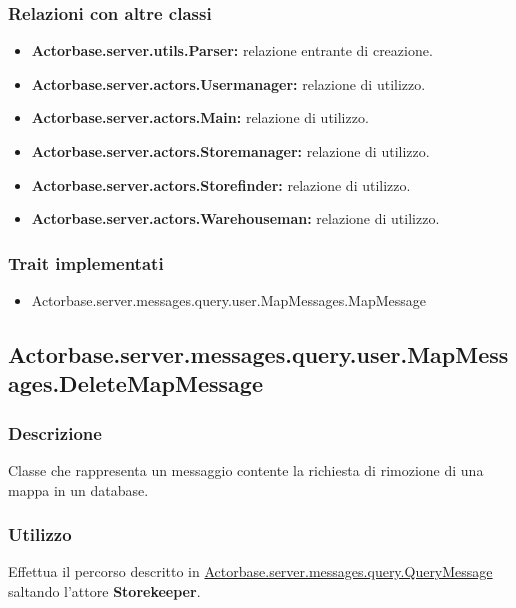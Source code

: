 \documentclass[a4paper]{article}
\begin{document}
			\subsubsection{Relazioni con altre classi}
				\begin{itemize}
					\item \textbf{Actorbase.server.utils.Parser:} relazione entrante di creazione.
					\item \textbf{Actorbase.server.actors.Usermanager:} relazione di utilizzo.
					\item \textbf{Actorbase.server.actors.Main:} relazione di utilizzo.
					\item \textbf{Actorbase.server.actors.Storemanager:} relazione di utilizzo.
					\item \textbf{Actorbase.server.actors.Storefinder:} relazione di utilizzo.
					\item \textbf{Actorbase.server.actors.Warehouseman:} relazione di utilizzo.
				\end{itemize}
			\subsubsection{Trait implementati}
				\begin{itemize}
					\item Actorbase.server.messages.query.user.MapMessages.MapMessage
				\end{itemize}
				
		\subsection{Actorbase.server.messages.query.user.MapMessages.DeleteMapMessage}
			\subsubsection{Descrizione}
				Classe che rappresenta un messaggio contente la richiesta di rimozione di una mappa in un database.
				
			\subsubsection{Utilizzo}
				Effettua il percorso descritto in \hyperref[QueryMessage]{Actorbase.server.messages.query.QueryMessage} saltando l'attore \textbf{Storekeeper}.
				
\end{document}
